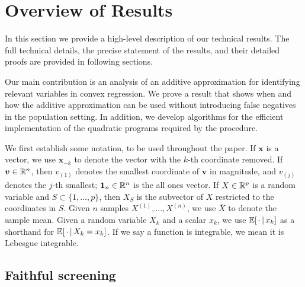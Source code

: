 \def\x{\mathbf{x}}

\section{Overview of Results}

In this section we provide a high-level description of our technical
results.  The full technical details, the precise statement of the
results, and their detailed proofs are provided in following sections.

Our main contribution is an analysis of an additive approximation for identifying
relevant variables in convex regression.  
We prove a result that shows when and how the additive approximation
can be used without introducing false negatives in the population
setting.  In addition, we develop algorithms for the efficient implementation of
the quadratic programs required by the procedure.  

We first establish some notation, to be used throughout the  paper.
If $\mathbf{x}$ is a vector, we use $\mathbf{x}_{-k}$ to denote the
vector with the $k$-th coordinate removed. If $\mbox{\boldmath $v$} \in {\mathbb R}^n$, then
$v_{(1)}$ denotes the smallest coordinate of $\mathbf{v}$ in
magnitude, and $v_{(j)}$ denotes the $j$-th smallest; $\mbox{\boldmath $1$}_n \in {\mathbb R}^n$
is the all ones vector. If $X \in {\mathbb R}^p$ is a random variable and $S \subset
\{1,...,p\}$, then $X_S$ is the subvector of $X$ restricted to
the coordinates in $S$. Given $n$ samples $X^{(1)},...,X^{(n)}$, we use
$\bar{X}$ to denote the sample mean. Given a random variable
$X_k$ and a scalar $x_k$, we use ${\mathbb E}[\,\cdot {\,|\,} x_k]$ as a shorthand
for ${\mathbb E}[\, \cdot {\,|\,} X_k = x_k]$. If we say a function is integrable, we 
mean it is Lebesgue integrable.


\subsection{Faithful screening}

